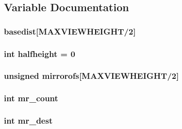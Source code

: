 \subsection{Variable Documentation}
\hypertarget{WOLFHACK_8C_a438b5b45fb7e4e8f4038de91c545a1de}{
\subsubsection[{basedist}]{ {\bf basedist}\mbox{[}MAXVIEWHEIGHT/2\mbox{]}}}
\label{WOLFHACK_8C_a438b5b45fb7e4e8f4038de91c545a1de}
\hypertarget{WOLFHACK_8C_a786e4a310fcb61bcadec564b0d88287c}{
\subsubsection[{halfheight}]{\setlength{\rightskip}{0pt plus 5cm}int {\bf halfheight} = 0}}
\label{WOLFHACK_8C_a786e4a310fcb61bcadec564b0d88287c}
\hypertarget{WOLFHACK_8C_a8d66d6359b69e9e7c5c7490437e38a5b}{
\subsubsection[{mirrorofs}]{\setlength{\rightskip}{0pt plus 5cm}unsigned {\bf mirrorofs}\mbox{[}MAXVIEWHEIGHT/2\mbox{]}}}
\label{WOLFHACK_8C_a8d66d6359b69e9e7c5c7490437e38a5b}
\hypertarget{WOLFHACK_8C_a879f6513ad9724ee834b04562c9d47f9}{
\subsubsection[{mr\_\-count}]{\setlength{\rightskip}{0pt plus 5cm}int {\bf mr\_\-count}}}
\label{WOLFHACK_8C_a879f6513ad9724ee834b04562c9d47f9}
\hypertarget{WOLFHACK_8C_a6c335719beda6e730be77c1a0d1ae3ce}{
\subsubsection[{mr\_\-dest}]{\setlength{\rightskip}{0pt plus 5cm}int {\bf mr\_\-dest}}}
\label{WOLFHACK_8C_a6c335719beda6e730be77c1a0d1ae3ce}
